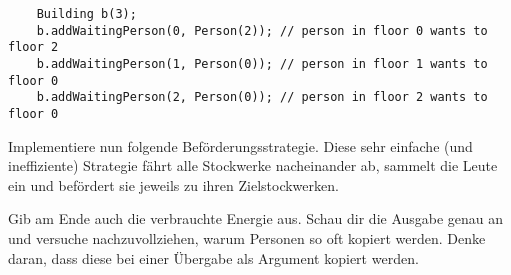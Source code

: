 \begin{lstlisting}
    Building b(3);
    b.addWaitingPerson(0, Person(2)); // person in floor 0 wants to floor 2
    b.addWaitingPerson(1, Person(0)); // person in floor 1 wants to floor 0
    b.addWaitingPerson(2, Person(0)); // person in floor 2 wants to floor 0
\end{lstlisting}

Implementiere nun folgende Beförderungsstrategie.
Diese sehr einfache (und ineffiziente) Strategie fährt alle Stockwerke nacheinander ab, sammelt die Leute ein und befördert sie jeweils zu ihren Zielstockwerken.

\begin{algorithm}[H]
 \SetAlgoLined
\end{algorithm}

Gib am Ende auch die verbrauchte Energie aus.
Schau dir die Ausgabe genau an und versuche nachzuvollziehen, warum Personen so oft kopiert werden.
Denke daran, dass diese bei einer Übergabe als Argument kopiert werden.

